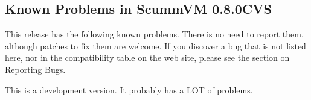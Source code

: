 

\subsection{Known Problems in ScummVM 0.8.0CVS}

This release has the following known problems. There is no need to report them,
although patches to fix them are welcome. If you discover a bug that is not
listed here, nor in the compatibility table on the web site, please see
the section on Reporting Bugs.

This is a development version. It probably has a LOT of problems. 
